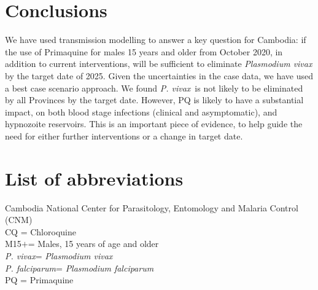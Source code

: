 \documentclass[doublespacing]{bmcart}
\newcommand{\pv}{\textit{P. vivax}}
\newcommand{\pf}{\textit{P. falciparum}}
\newcommand{\males}{M15$+$}
\begin{document}
\section*{Conclusions}

We have used transmission modelling to answer a key question for Cambodia: if the use of Primaquine for males 15 years and older from October 2020, in addition to current interventions, will be sufficient to eliminate \textit{Plasmodium vivax} by the target date of 2025. Given the uncertainties in the case data, we have used a best case scenario approach. We found \pv~is not likely to be eliminated by all Provinces by the target date. However, PQ is likely to have a substantial impact, on both blood stage infections (clinical and asymptomatic), and hypnozoite reservoirs. This is an important piece of evidence, to help guide the need for either further interventions or a change in target date. 

\section*{List of abbreviations}
Cambodia National Center for Parasitology, Entomology and Malaria Control (CNM)\\
CQ = Chloroquine \\
\males = Males, 15 years of age and older \\ 
\pv = \textit{Plasmodium vivax} \\
\pf = \textit{Plasmodium falciparum} \\
PQ = Primaquine \\


\end{document}
